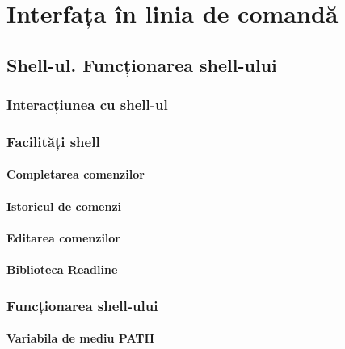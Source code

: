 \chapter{Interfața în linia de comandă}
\label{chapter:cli}

\section{Shell-ul. Funcționarea shell-ului}
\label{sec:cli-shell}

\subsection{Interacțiunea cu shell-ul}
\label{sec:cli-shell-interact}

\subsection{Facilități shell}
\label{sec:cli-shell-characteristics}

\subsubsection{Completarea comenzilor}
\label{sec:cli-completion}

\subsubsection{Istoricul de comenzi}
\label{sec:cli-history}

\subsubsection{Editarea comenzilor}
\label{sec:cli-editing}

\subsubsection{Biblioteca Readline}
\label{sec:cli-readline}

\subsection{Funcționarea shell-ului}
\label{sec:cli-shell-func}

\subsubsection{Variabila de mediu PATH}
\label{sec:cli-path}


